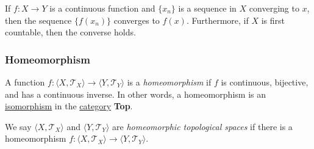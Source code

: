 \begin{corollary}
If $f:X \rightarrow Y$ is a continuous function and $\{ x_n \}$ is a sequence in $X$ converging to $x$, then the sequence $\{ f(x_n) \}$ converges
to $f(x)$. Furthermore, if $X$ is first countable, then the converse holds.
\end{corollary}

\subsubsection{Homeomorphism}\label{homeomorphism}
A function $f : \langle X,\mathcal{T}_X \rangle \rightarrow \langle Y,\mathcal{T}_Y \rangle$ is a \emph{homeomorphism} if $f$ is continuous, bijective, and has a continuous inverse. In other words, a homeomorphism is
an \hyperref[isomorphism]{isomorphism} in the \hyperref[category]{category} \textbf{Top}.

\label{homeomorphicspaces}
We say $\langle X,\mathcal{T}_X \rangle$ and $\langle Y,\mathcal{T}_Y \rangle$ are \emph{homeomorphic topological spaces} if there is a homeomorphism $f:\langle X,\mathcal{T}_X \rangle \rightarrow \langle Y,\mathcal{T}_Y \rangle$.